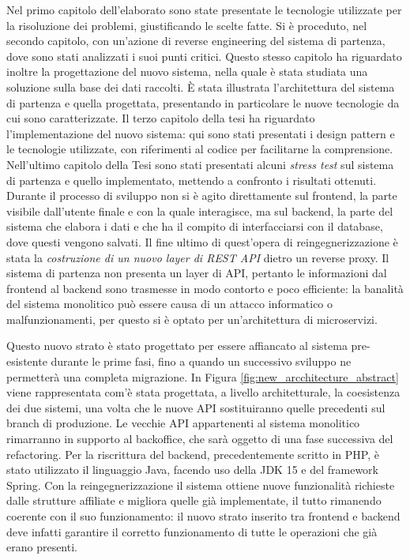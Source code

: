 \documentclass[a4paper,11pt]{article}
\begin{document}
	   Nel primo capitolo dell'elaborato sono state presentate le tecnologie utilizzate per la risoluzione dei problemi, giustificando le scelte fatte. Si è proceduto, nel secondo capitolo, con un'azione di reverse engineering del sistema di partenza, dove sono stati analizzati i suoi punti critici. Questo stesso capitolo ha riguardato inoltre la progettazione del nuovo sistema, nella quale è stata studiata una soluzione sulla base dei dati raccolti. È stata illustrata l'architettura del sistema di partenza e quella progettata, presentando in particolare le nuove tecnologie da cui sono caratterizzate. Il terzo capitolo della tesi ha riguardato l'implementazione del nuovo sistema: qui sono stati presentati i design pattern e le tecnologie utilizzate, con riferimenti al codice per facilitarne la comprensione. Nell'ultimo capitolo della Tesi sono stati presentati alcuni \emph{stress test} sul sistema di partenza e quello implementato, mettendo a confronto i risultati ottenuti. Durante il processo di sviluppo non si è agito direttamente sul frontend, la parte visibile dall’utente finale e con la quale interagisce, ma sul backend, la parte del sistema che elabora i dati e che ha il compito di interfacciarsi con il database, dove questi vengono salvati. Il fine ultimo di quest’opera di reingegnerizzazione è stata la \emph{costruzione di un nuovo layer di REST API} dietro un reverse proxy. Il sistema di partenza non presenta un layer di API, pertanto le informazioni dal frontend al backend sono trasmesse in modo contorto e poco efficiente: la banalità del sistema monolitico può essere causa di un attacco informatico o malfunzionamenti, per questo si è optato per un’architettura di microservizi. 
	   
	   Questo nuovo strato è stato progettato per essere affiancato al sistema pre-esistente durante le prime fasi, fino a quando un successivo sviluppo ne permetterà una completa migrazione. In Figura \ref{fig:new_arcchitecture_abstract} viene rappresentata com'è stata progettata, a livello architetturale, la coesistenza dei due sistemi, una volta che le nuove API sostituiranno quelle precedenti sul branch di produzione. Le vecchie API appartenenti al sistema monolitico rimarranno in supporto al backoffice, che sarà oggetto di una fase successiva del refactoring. Per la riscrittura del backend, precedentemente scritto in PHP, è stato utilizzato il linguaggio Java, facendo uso della JDK 15 e del framework Spring. Con la reingegnerizzazione il sistema ottiene nuove funzionalità richieste dalle strutture affiliate e migliora quelle già implementate, il tutto rimanendo coerente con il suo funzionamento: il nuovo strato inserito tra frontend e backend deve infatti garantire il corretto funzionamento di tutte le operazioni che già erano presenti. 
\end{document}
